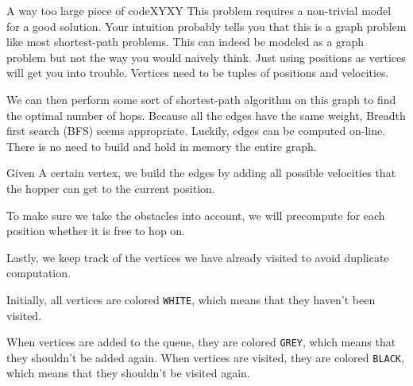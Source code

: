\documentclass{writeup}
\begin{document}
\begin{solutions}
  \begin{solution}{A way too large piece of code}{XY}{XY}
    This problem requires a non-trivial model for a good solution.
    Your intuition probably tells you that this is a graph problem like most shortest-path problems.
    This can indeed be modeled as a graph problem but not the way you would naively think.
    Just using positions as vertices will get you into trouble.
    Vertices need to be tuples of positions and velocities.


    We can then perform some sort of shortest-path algorithm on this graph to find the optimal number of hops.
    Because all the edges have the same weight, Breadth first search (BFS) seems appropriate.
    Luckily, edges can be computed on-line.
    There is no need to build and hold in memory the entire graph.

    Given A certain vertex, we build the edges by adding all possible velocities that the hopper can get to the current position.
    

    To make sure we take the obstacles into account, we will precompute for each position whether it is free to hop on.


    Lastly, we keep track of the vertices we have already visited to avoid duplicate computation.


    Initially, all vertices are colored \texttt{WHITE}, which means that they haven't been visited.

  
    When vertices are added to the queue, they are colored \texttt{GREY}, which means that they shouldn't be added again.
    When vertices are visited, they are colored \texttt{BLACK}, which means that they shouldn't be visited again.


  \end{solution}
\end{solutions}
\end{document}
